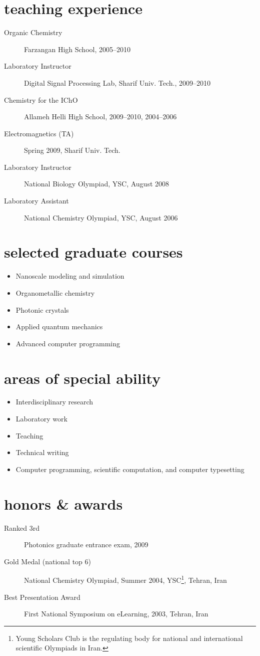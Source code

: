 \documentclass[overlapped,line,10pt,letterpaper]{res}
\begin{document}
\begin{resume}
\section{teaching experience}
\begin{description}
\item[Organic Chemistry] Farzangan High School, 2005–2010
\item[Laboratory Instructor] Digital Signal Processing Lab, Sharif Univ. Tech., 2009–2010
\item[Chemistry for the IChO] Allameh Helli High School, 2009–2010, 2004–2006
\item[Electromagnetics (TA)] Spring 2009, Sharif Univ. Tech.
\item[Laboratory Instructor] National Biology Olympiad, YSC, August 2008
\item[Laboratory Assistant] National Chemistry Olympiad, YSC, August 2006
\end{description}

\section{selected graduate courses}
\begin{itemize}
\item Nanoscale modeling and simulation
\item Organometallic chemistry
\item Photonic crystals
\item Applied quantum mechanics
\item Advanced computer programming
\end{itemize}

\section{areas of special ability}
\begin{itemize}
\item Interdisciplinary research
\item Laboratory work
\item Teaching
\item Technical writing
\item Computer programming, scientific computation, and computer typesetting
\end{itemize}

\section{honors \& awards}
\begin{description}
\item[Ranked 3rd] Photonics graduate entrance exam, 2009 
\item[Gold Medal (national top 6)] National Chemistry Olympiad, Summer 2004, YSC\footnote{Young Scholars Club is the regulating body for national and international scientific Olympiads in Iran.}, Tehran, Iran
\item[Best Presentation Award] First National Symposium on eLearning, 2003,
Tehran, Iran
\end{description}


\end{resume}
\end{document}
